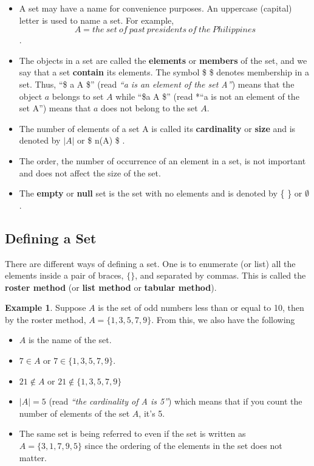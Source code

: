 \documentclass[]{book}
\providecommand{\tightlist}{%
  \setlength{\itemsep}{0pt}\setlength{\parskip}{0pt}}
\theoremstyle{definition}
\theoremstyle{definition}
\newtheorem{example}{Example}[chapter]
\theoremstyle{definition}
\theoremstyle{remark}
\begin{document}
\begin{itemize}
\tightlist
\item
  A set may have a name for convenience purposes. An uppercase (capital) letter is used to name a set. For example,
  \[ A = the~set~of~past~presidents~of~the~Philippines \].\\
\item
  The objects in a set are called the \textbf{elements} or \textbf{members} of the set, and we say that a set \textbf{contain} its elements. The symbol \$ \in \$ denotes membership in a set. Thus, ``\$ a \in A \$'' (read \emph{``a is an element of the set A''}) means that the object \(a\) belongs to set \(A\) while ``\$a \notin A \$'' (read *``a is not an element of the set A'') means that \(a\) does not belong to the set \(A\).
\item
  The number of elements of a set A is called its \textbf{cardinality} or \textbf{size} and is denoted by \(|A|\) or \$ n(A) \$ .
\item
  The order, the number of occurrence of an element in a set, is not important and does not affect the size of the set.
\item
  The \textbf{empty} or \textbf{null} set is the set with no elements and is denoted by \{ \} or \(\emptyset\).
\end{itemize}

\hypertarget{defining-a-set}{%
\subsection*{Defining a Set}\label{defining-a-set}}

There are different ways of defining a set. One is to enumerate (or list) all the elements inside a pair of braces, \(\{ \}\), and separated by commas. This is called the \textbf{roster method} (or \textbf{list method} or \textbf{tabular method}).

\begin{example}
\protect\hypertarget{exm:unnamed-chunk-2}{}{\label{exm:unnamed-chunk-2} } Suppose \(A\) is the set of odd numbers less than or equal to 10, then by the roster method, \(A = \{1,3,5,7,9\}\). From this, we also have the following
\end{example}

\begin{itemize}
\tightlist
\item
  \(A\) is the name of the set.
\item
  \(7 \in A\) or \(7 \in \{1,3,5,7,9\}\).
\item
  \(21 \notin A\) or \(21 \notin \{1,3,5,7,9\}\)
\item
  \(|A| = 5\) (read \emph{``the cardinality of A is 5''}) which means that if you count the number of elements of the set \(A\), it's 5.
\item
  The same set is being referred to even if the set is written as \(A = \{3, 1,7,9,5\}\) since the ordering of the elements in the set does not matter.
\end{itemize}
\end{document}
